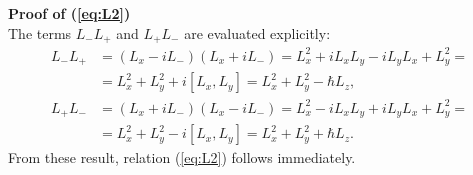 \begin{tcolorbox} 
\textbf{Proof of (\ref{eq:L2})} \\
The terms $L_- L_+$ and $L_+ L_-$ are evaluated explicitly:
\begin{align*}
    L_- L_+ &= (L_x - i L_-)(L_x + i L_-) = L_x^2 + i L_x L_y - i L_y L_x + L_y^2 = \\
    &= L_x^2 + L_y^2 +i [L_x,L_y] = L_x^2 + L_y^2 - \hbar L_z, \\ 
    L_+ L_- &= (L_x + i L_-)(L_x - i L_-) = L_x^2 - i L_x L_y + i L_y L_x + L_y^2 = \\
    & = L_x^2 + L_y^2 -i [L_x,L_y] = L_x^2 + L_y^2 + \hbar L_z.
\end{align*}
From these result, relation (\ref{eq:L2}) follows immediately. 
\end{tcolorbox}

